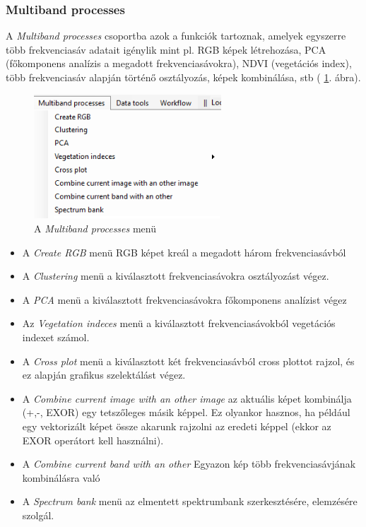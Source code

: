 \documentclass[a4paper,12pt]{article}
\begin{document}
	 
\subsubsection{Multiband processes}

A\textit{ Multiband processes} csoportba azok a funkciók tartoznak, amelyek egyszerre több frekvenciasáv adatait igénylik mint pl. RGB képek létrehozása, PCA (főkomponens analízis a megadott frekvenciasávokra), NDVI (vegetációs index), több frekvenciasáv alapján történő osztályozás, képek kombinálása, stb ( \ref{fig:multiband_menu}. ábra). 


	\begin{figure}
	\centering
	\includegraphics[width=7cm]{multiband_menu.png}
	\caption{A \textit{Multiband processes} menü}
	\label{fig:multiband_menu}
	\end{figure}


\begin{itemize}
	
	\item A \textit{Create RGB} menü RGB képet kreál a megadott három frekvenciasávból
	
	
	\item A \textit{Clustering} menü a kiválasztott frekvenciasávokra osztályozást végez.
	
	\item A \textit{PCA} menü a kiválasztott frekvenciasávokra főkomponens analízist végez
	
	\item Az \textit{Vegetation indeces} menü a kiválasztott frekvenciasávokból vegetációs indexet számol.
	
	\item A \textit{Cross plot} menü a kiválasztott két frekvenciasávból cross plottot rajzol, és ez alapján grafikus szelektálást végez.
	
	\item A \textit{Combine current image with an other image} az aktuális képet kombinálja (+,-, EXOR) egy tetszőleges másik képpel. Ez olyankor hasznos, ha például egy vektorizált képet össze akarunk rajzolni az eredeti képpel (ekkor az EXOR operátort kell használni).
	
	\item A \textit{Combine current band with an other} Egyazon kép több frekvenciasávjának kombinálásra való
	
	\item A \textit{Spectrum bank} menü az elmentett spektrumbank szerkesztésére, elemzésére szolgál.
	

\end{itemize}
\end{document}
